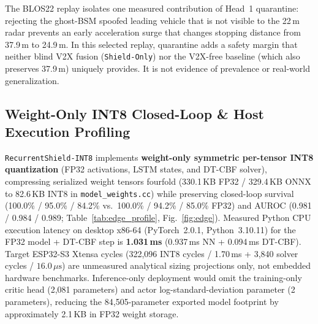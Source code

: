 \documentclass[journal]{IEEEtran}
\begin{document}
The BLOS22 replay isolates one measured contribution of Head~1 quarantine: rejecting the ghost-BSM spoofed leading vehicle that is not visible to the 22\,m radar prevents an early acceleration surge that changes stopping distance from 37.9\,m to 24.9\,m. In this selected replay, quarantine adds a safety margin that neither blind V2X fusion (\texttt{Shield-Only}) nor the V2X-free baseline (which also preserves 37.9\,m) uniquely provides. It is not evidence of prevalence or real-world generalization.

\subsection{Weight-Only INT8 Closed-Loop \& Host Execution Profiling}
\texttt{RecurrentShield-INT8} implements \textbf{weight-only symmetric per-tensor INT8 quantization} (FP32 activations, LSTM states, and DT-CBF solver), compressing serialized weight tensors fourfold (330.1\,KB FP32 / 329.4\,KB ONNX to 82.6\,KB INT8 in \texttt{model\_weights.cc}) while preserving closed-loop survival (100.0\% / 95.0\% / 84.2\% vs.\ 100.0\% / 94.2\% / 85.0\% FP32) and AUROC (0.981 / 0.984 / 0.989; Table~\ref{tab:edge_profile}, Fig.~\ref{fig:edge}). Measured Python CPU execution latency on desktop x86-64 (PyTorch~2.0.1, Python~3.10.11) for the FP32 model + DT-CBF step is \textbf{1.031\,ms} (0.937\,ms NN + 0.094\,ms DT-CBF). Target ESP32-S3 Xtensa cycles (322,096 INT8 cycles / 1.70\,ms + 3,840 solver cycles / $16.0\,\mu\text{s}$) are unmeasured analytical sizing projections only, not embedded hardware benchmarks. Inference-only deployment would omit the training-only critic head (2,081 parameters) and actor log-standard-deviation parameter (2 parameters), reducing the 84,505-parameter exported model footprint by approximately 2.1\,KB in FP32 weight storage.

\begin{table}[t]
\centering
\caption{Weight-Only INT8 Closed-Loop Fidelity, Size \& Host Timing}
\label{tab:edge_profile}
\scriptsize
\setlength{\tabcolsep}{1.6pt}
\end{table}
\end{document}

